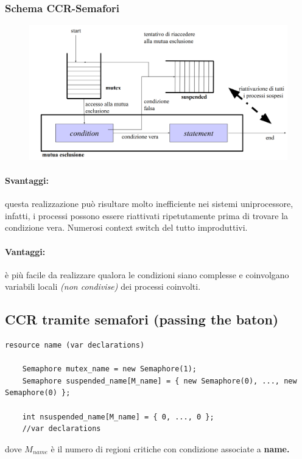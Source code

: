 \subsubsection{Schema CCR-Semafori}
\begin{figure} [h]
    \centering
    \includegraphics[width=0.85\linewidth]{Images/Screenshot 2025-01-16 at 12-03-09 so-03.1-concorrenza - so-03.1-concorrenza.pdf.png}
\end{figure}

\paragraph{Svantaggi:} questa realizzazione può risultare molto inefficiente nei sistemi uniprocessore, infatti, i processi possono essere riattivati ripetutamente prima di trovare la condizione vera.
Numerosi context switch del tutto improduttivi.

\paragraph{Vantaggi:} è più facile da realizzare qualora le condizioni siano complesse e coinvolgano variabili locali \textit{(non condivise)} dei processi coinvolti.

\subsection{CCR tramite semafori (passing the baton)}
\begin{lstlisting}
resource name (var declarations)

    Semaphore mutex_name = new Semaphore(1);
    Semaphore suspended_name[M_name] = { new Semaphore(0), ..., new Semaphore(0) };

    int nsuspended_name[M_name] = { 0, ..., 0 };
    //var declarations
\end{lstlisting}
dove $M_{name}$ è il numero di regioni critiche con condizione associate a \textbf{name.}

